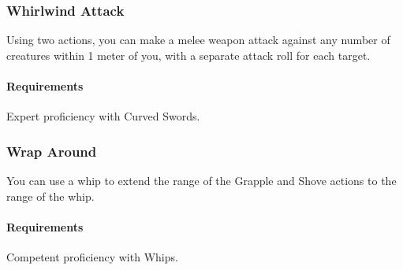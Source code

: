 \subsubsection{Whirlwind Attack} \label{feat::whirlwindattack}
    Using two actions, you can make a melee weapon attack against any number of creatures within 1 meter of you, with a separate attack roll for each target.
    \paragraph{Requirements} Expert proficiency with Curved Swords.
\subsubsection{Wrap Around} \label{feat::wraparound}
    You can use a whip to extend the range of the Grapple and Shove actions to the range of the whip.
    \paragraph{Requirements} Competent proficiency with Whips.

